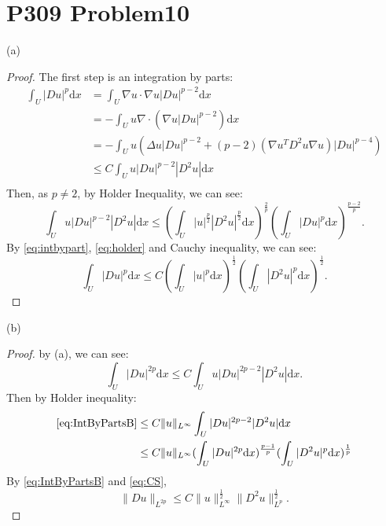 \documentclass[a4paper]{ctexart}
\newcommand{\dif}{\mathrm{d}}
\begin{document}
\section*{P309 Problem10}
(a)
\begin{proof}
    The first step is an integration by parts:
    \begin{equation}
        \label{eq:intbypart}
        \begin{aligned}
        \int_{U}|Du|^{p}\dif x&=\int_{U}\nabla u\cdot\nabla u|Du|^{p-2}\dif x\\
        &=-\int_{U}u\nabla\cdot(\nabla u|Du|^{p-2})\dif x\\
        &=-\int_{U}u(\Delta u|Du|^{p-2}+(p-2)(\nabla u^{T}D^{2}u\nabla u)|Du|^{p-4})\\
        &\le C\int_{U}u|Du|^{p-2}|D^{2}u|\dif x\\
        \end{aligned}
    \end{equation}    
    Then, as $p\neq 2$, by Holder Inequality, we can see:
    \begin{equation}
        \label{eq:holder}
        \int_{U}u|Du|^{p-2}|D^{2}u|\dif x\le(\int_{U}|u|^{\frac{p}{2}}|D^{2}u|^{\frac{p}{2}}\dif x)^{\frac{2}{p}}(\int_{U}|Du|^{p}\dif x)^{\frac{p-2}{p}}.
    \end{equation}
    By \eqref{eq:intbypart}, \eqref{eq:holder} and Cauchy inequality, we can see:
    \begin{equation}
        \int_{U}|Du|^{p}\dif x\le C(\int_{U}|u|^{p}\dif x)^{\frac{1}{2}}(\int_{U}|D^{2}u|^{p}\dif x)^{\frac{1}{2}}.
    \end{equation}
\end{proof}
(b)
\begin{proof}
    by (a), we can see:
    \begin{equation}
        \label{eq:IntByPartsB}
        \int_{U}|Du|^{2p}\dif x\le C\int_{U}u|Du|^{2p-2}|D^{2}u|\dif x.
    \end{equation}
    Then by Holder inequality:
    \begin{equation}
        \label{eq:CS}
        \begin{aligned}
            \eqref{eq:IntByPartsB}&\le C\|u\|_{L^\infty}\int_{U}|Du|^{2p-2}|D^{2}u|\dif x\\
            &\le C\|u\|_{L^{\infty}}(\int_{U}|Du|^{2p}\dif x)^{\frac{p-1}{p}}(\int_{U}|D^{2}u|^{p}\dif x)^{\frac{1}{p}}\\
        \end{aligned}
    \end{equation}
    By \eqref{eq:IntByPartsB} and \eqref{eq:CS}, 
    \begin{equation}
        \|Du\|_{L^{2p}}\le C\|u\|_{L^{\infty}}^{\frac{1}{2}}\|D^{2}u\|_{L^{p}}^{\frac{1}{2}}.
    \end{equation}
\end{proof}
\end{document}
